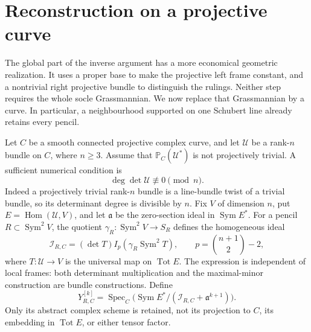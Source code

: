\documentclass[11pt,reqno]{amsart}
\numberwithin{equation}{section}
\theoremstyle{definition}\newtheorem{definition}[theorem]{Definition}
\theoremstyle{remark}\newtheorem{remark}[theorem]{Remark}
\newcommand{\Pj}{\mathbb P}\newcommand{\A}{\mathbb A}
\DeclareMathOperator{\Sym}{Sym}\DeclareMathOperator{\Gr}{Gr}
\DeclareMathOperator{\Hom}{Hom}\DeclareMathOperator{\Tot}{Tot}
\DeclareMathOperator{\Spec}{Spec}\DeclareMathOperator{\PGL}{PGL}
\begin{document}
\section{Reconstruction on a projective curve}
\label{sec:curve-recognition-v145}

The global part of the inverse argument has a more economical geometric
realization.  It uses a proper base to make the projective left frame
constant, and a nontrivial right projective bundle to distinguish the
rulings.  Neither step requires the whole socle Grassmannian.  We now
replace that Grassmannian by a curve.  In particular, a neighbourhood
supported on one Schubert line already retains every pencil.

Let \(C\) be a smooth connected projective complex curve, and let
\(\mathcal U\) be a rank-\(n\) bundle on \(C\), where \(n\ge3\).
Assume that \(\Pj_C(\mathcal U^*)\) is not projectively trivial.
A sufficient numerical condition is
\begin{equation}\label{eq:curve-degree-obstruction-v145}
                 \deg\det\mathcal U\not\equiv0\pmod n.
\end{equation}
Indeed a projectively trivial rank-\(n\) bundle is a line-bundle twist
of a trivial bundle, so its determinant degree is divisible by \(n\).
Fix \(V\) of dimension \(n\), put \(E=\Hom(\mathcal U,V)\),
and let \(\mathfrak a\) be the zero-section ideal in
\(\Sym E^*\).  For a pencil \(R\subset\Sym^2V\), the quotient
\(\gamma_R:\Sym^2V\to S_R\) defines the homogeneous ideal
\begin{equation}\label{eq:curve-failure-ideal-v145}
 \mathcal I_{R,C}=(\det T)I_p(\gamma_R\Sym^2T),
 \qquad p=\binom{n+1}{2}-2,
\end{equation}
where \(T:\mathcal U\to V\) is the universal map on \(\Tot E\).
The expression is independent of local frames: both determinant
multiplication and the maximal-minor construction are bundle
constructions.  Define
\[
 Y_{R,C}^{[k]}=\Spec_C\bigl(\Sym E^*/
             (\mathcal I_{R,C}+\mathfrak a^{k+1})\bigr).
\]
Only its abstract complex scheme is retained, not its projection to
\(C\), its embedding in \(\Tot E\), or either tensor factor.
\end{document}
